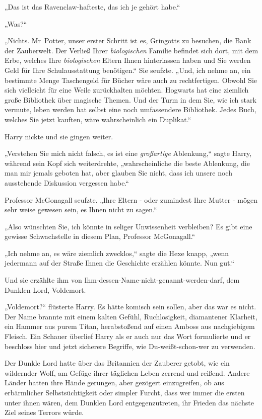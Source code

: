 {„Das ist das Ravenclaw-hafteste, das ich je gehört habe.“

„Was?“

„Nichts. Mr~Potter, unser erster Schritt ist es, Gringotts zu besuchen, die Bank der Zauberwelt. Der Verließ Ihrer \emph{biologischen} Familie befindet sich dort, mit dem Erbe, welches Ihre \emph{biologischen} Eltern Ihnen hinterlassen haben und Sie werden Geld für Ihre Schulausstattung benötigen.“ Sie seufzte. „Und, ich nehme an, ein bestimmte Menge Taschengeld für Bücher wäre auch zu rechtfertigen. Obwohl Sie sich vielleicht für eine Weile zurückhalten möchten. Hogwarts hat eine ziemlich große Bibliothek über magische Themen. Und der Turm in dem Sie, wie ich stark vermute, leben werden hat selbst eine noch umfassendere Bibliothek. Jedes Buch, welches Sie jetzt kauften, wäre wahrscheinlich ein Duplikat.“

Harry nickte und sie gingen weiter.

„Verstehen Sie mich nicht falsch, es ist eine \emph{großartige} Ablenkung,“ sagte Harry, während sein Kopf sich weiterdrehte, „wahrscheinliche die beste Ablenkung, die man mir jemals geboten hat, aber glauben Sie nicht, dass ich unsere noch ausstehende Diskussion vergessen habe.“

Professor McGonagall seufzte. „Ihre Eltern - oder zumindest Ihre Mutter - mögen sehr weise gewesen sein, es Ihnen nicht zu sagen.“

„Also wünschten Sie, ich könnte in seliger Unwissenheit verbleiben? Es gibt eine gewisse Schwachstelle in diesem Plan, Professor McGonagall.“

„Ich nehme an, es wäre ziemlich zwecklos,“ sagte die Hexe knapp, „wenn jedermann auf der Straße Ihnen die Geschichte erzählen könnte. Nun gut.“

Und sie erzählte ihm von Ihm-dessen-Name-nicht-genannt-werden-darf, dem Dunklen Lord, Voldemort.

„Voldemort?“ flüsterte Harry. Es hätte komisch sein sollen, aber das war es nicht. Der Name brannte mit einem kalten Gefühl, Ruchlosigkeit, diamantener Klarheit, ein Hammer aus purem Titan, herabstoßend auf einen Amboss aus nachgiebigem Fleisch. Ein Schauer überlief Harry als er auch nur das Wort formulierte und er beschloss hier und jetzt sicherere Begriffe, wie Du-weißt-schon-wer zu verwenden.

Der Dunkle Lord hatte über das Britannien der Zauberer getobt, wie ein wildernder Wolf, am Gefüge ihrer täglichen Leben zerrend und reißend. Andere Länder hatten ihre Hände gerungen, aber gezögert einzugreifen, ob aus erbärmlicher Selbstsüchtigkeit oder simpler Furcht, dass wer immer die ersten unter ihnen wären, dem Dunklen Lord entgegenzutreten, ihr Frieden das nächste Ziel seines Terrors würde.

}
